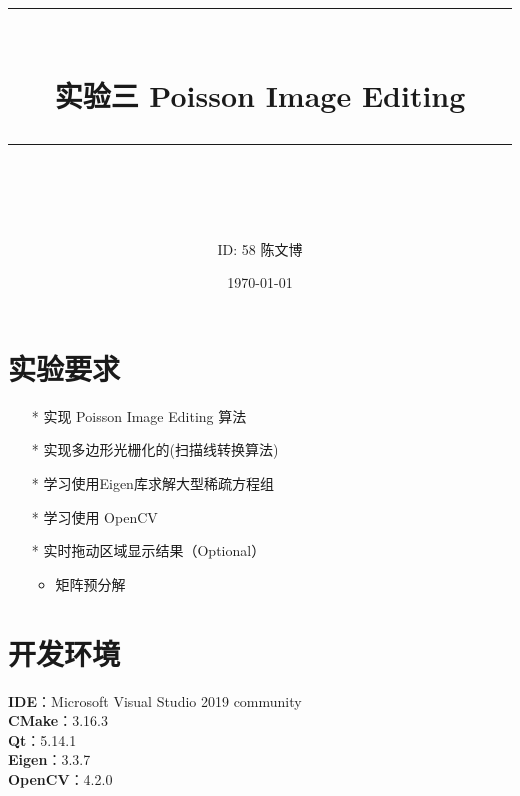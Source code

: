 \documentclass[14pt]{scrartcl} %
\title{	
	\normalfont\normalsize
	\rule{\linewidth}{0.5pt}\\ %
	\vspace{20pt} %
	{\huge 实验三	Poisson Image Editing}\\ %
	\vspace{12pt} %
	\rule{\linewidth}{2pt}\\ %
	\vspace{12pt} %
}
\author{\LARGE ID: 58		陈文博} %
\date{\normalsize\today} %
\begin{document}
	
	\maketitle %
	
	
	\section{实验要求}
	
	
	\begin{itemize}
		\item[*] 实现 Poisson Image Editing 算法
		\item[*] 实现多边形光栅化的(扫描线转换算法)
		\item[*] 学习使用Eigen库求解大型稀疏方程组
		\item[*] 学习使用 OpenCV
		\item[*] 实时拖动区域显示结果（Optional）
		\begin{itemize}
			\item 矩阵预分解
		\end{itemize}
	\end{itemize}
	
	
	\section{开发环境}
	
	\textbf{IDE}：Microsoft Visual Studio 2019 community\\
	\textbf{CMake}：3.16.3\\
	\textbf{Qt}：5.14.1\\
	\textbf{Eigen}：3.3.7\\
	\textbf{OpenCV}：4.2.0
	
	
	\pagebreak
\end{document}
